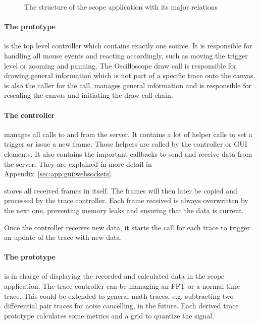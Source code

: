 \begin{figure}
    \centering
    
    \caption[The scope structure]{%
        The structure of the scope application with its major relations%
    }
    \label{fig:gui:structure}
\end{figure}

%
%

\paragraph{The   prototype}  is  the  top level  controller
which contains  exactly one source. It  is responsible for handling  all mouse
events  and  reacting  accordingly,  such  as  moving  the  trigger  level  or
zooming and  panning.  The Oscilloscope  draw call is responsible  for drawing
general information  which is not  part of a  specific trace onto  the canvas.
  is  also  the  caller for  the    
call.   manages general information and  is responsible for
rescaling the canvas and initiating the draw call chain.

\paragraph{The    controller}  manages  all  calls  to  and  from
the  server. It  contains  a  lot  of   helper  calls  to  set  a  trigger  or
issue  a  new  frame. Those  helpers are  called  by  the  
controller or GUI elements.  It also  contains the important callbacks to send
and  receive data  from  the  server. They are  explained  in  more detail  in
Appendix~\ref{sec:app:gui:websockets}.

 stores all received frames in itself. The frames will then later
be  copied and  processed by  the trace  controller.  Each  frame received  is
always overwritten by the next one,  preventing memory leaks and ensuring that
the data is current.

Once  the     controller  receives   new  data,  it   starts  the
 call for each  trace to trigger an update of  the trace with new
data.

\paragraph{The  prototype} is in charge of displaying the recorded
and calculated  data in the  scope application.   The trace controller  can be
managing an FFT or a normal time trace. This could be extended to general math
traces, e.g. subtracting two differential pair traces for noise cancelling, in
the future.  Each  derived trace prototype calculates some metrics  and a grid
to quantize the signal.

